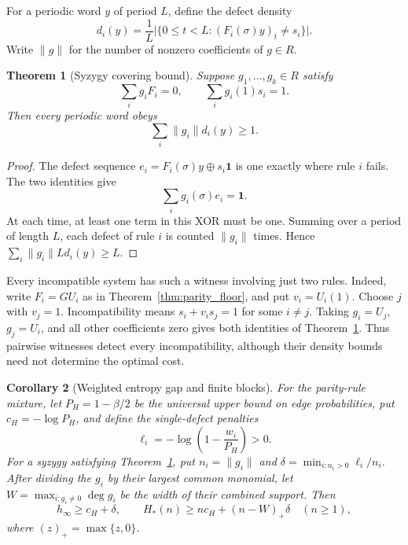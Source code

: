 \documentclass[11pt,a4paper]{article}
\newtheorem{theorem}{Theorem}
\newtheorem{corollary}[theorem]{Corollary}
\begin{document}
For a periodic word $y$ of period $L$, define the defect density
\[
    d_i(y)=\frac1L\bigl|\{0\le t<L:(F_i(\sigma)y)_t\ne s_i\}\bigr|.
\]
Write $\|g\|$ for the number of nonzero coefficients of $g\in R$.

\begin{theorem}[Syzygy covering bound]
\label{thm:syzygy_bound}
Suppose $g_1,\ldots,g_k\in R$ satisfy
\[
    \sum_i g_iF_i=0,\qquad \sum_i g_i(1)s_i=1.
\]
Then every periodic word obeys
\begin{equation}
\label{eq:syzygy_bound}
    \sum_i\|g_i\|d_i(y)\ge1.
\end{equation}
\end{theorem}

\begin{proof}
The defect sequence $e_i=F_i(\sigma)y\oplus s_i\mathbf1$ is one
exactly where rule $i$ fails.  The two identities give
\[
    \sum_i g_i(\sigma)e_i=\mathbf1.
\]
At each time, at least one term in this XOR must be one.  Summing
over a period of length $L$, each defect of rule $i$ is counted
$\|g_i\|$ times.  Hence $\sum_i\|g_i\|Ld_i(y)\ge L$.
\end{proof}

Every incompatible system has such a witness involving just two rules.
Indeed, write $F_i=GU_i$ as in Theorem~\ref{thm:parity_floor}, and put
$v_i=U_i(1)$.  Choose $j$ with $v_j=1$.  Incompatibility means
$s_i+v_i s_j=1$ for some $i\ne j$.  Taking
$g_i=U_j$, $g_j=U_i$, and all other coefficients zero gives both
identities of Theorem~\ref{thm:syzygy_bound}.
Thus pairwise witnesses detect every incompatibility, although their
density bounds need not determine the optimal cost.

\begin{corollary}[Weighted entropy gap and finite blocks]
\label{cor:weighted_syzygy}
For the parity-rule mixture, let $P_H=1-\beta/2$ be the universal
upper bound on edge probabilities, put $c_H=-\log P_H$, and define
the single-defect penalties
\[
    \ell_i=-\log\left(1-\frac{w_i}{P_H}\right)>0.
\]
For a syzygy satisfying Theorem~\ref{thm:syzygy_bound}, put
$n_i=\|g_i\|$ and $\delta=\min_{i:n_i>0}\ell_i/n_i$.
After dividing the $g_i$ by their largest common monomial, let
$W=\max_{i:g_i\ne0}\deg g_i$ be the width of their combined support.
Then
\begin{equation}
\label{eq:weighted_syzygy}
    h_\infty\ge c_H+\delta,
    \qquad H_*(n)\ge nc_H+(n-W)_+\delta\quad(n\ge1),
\end{equation}
where $(z)_+=\max\{z,0\}$.
\end{corollary}
\end{document}
